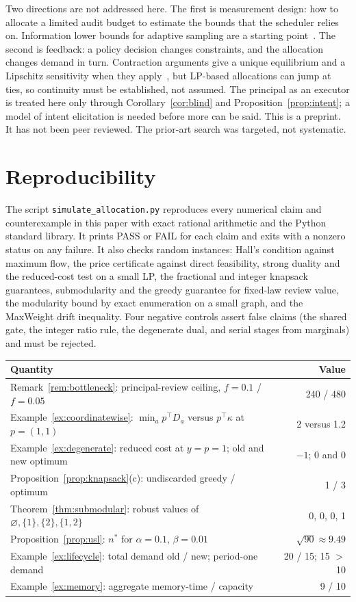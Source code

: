 \documentclass[11pt]{article}
\theoremstyle{definition}
\theoremstyle{remark}
\begin{document}
Two directions are not addressed here. The first is measurement design: how to allocate a limited audit budget
to estimate the bounds that the scheduler relies on. Information lower bounds for adaptive sampling are
a starting point~\cite{kaufmann}. The second is feedback: a policy decision changes constraints, and
the allocation changes demand in turn. Contraction arguments give a unique equilibrium and a Lipschitz
sensitivity when they apply~\cite{banach}, but LP-based allocations can jump at ties, so continuity
must be established, not assumed. The principal as an executor is treated here only through
Corollary~\ref{cor:blind} and Proposition~\ref{prop:intent}; a model of intent elicitation is needed
before more can be said. This is a preprint. It has not been peer reviewed. The prior-art search was targeted, not
systematic.

\section{Reproducibility}\label{sec:repro}
The script \texttt{simulate\_allocation.py} reproduces every numerical claim and counterexample in
this paper with exact rational arithmetic and the Python standard library. It prints PASS or FAIL for
each claim and exits with a nonzero status on any failure. It also checks random instances: Hall's
condition against maximum flow, the price certificate against direct feasibility, strong duality and
the reduced-cost test on a small LP, the fractional and integer knapsack guarantees, submodularity and
the greedy guarantee for fixed-law review value, the modularity bound by exact enumeration on a small
graph, and the MaxWeight drift inequality. Four negative controls assert false claims (the shared
gate, the integer ratio rule, the degenerate dual, and serial stages from marginals) and must be
rejected.

\begin{center}\small
\begin{tabular}{p{}r}
\toprule Quantity & Value\\\midrule
Remark~\ref{rem:bottleneck}: principal-review ceiling, $f=0.1$ / $f=0.05$ & 240 / 480\\
Example~\ref{ex:coordinatewise}: $\min_a p^\top D_a$ versus $p^\top\kappa$ at $p=(1,1)$ & 2 versus 1.2\\
Example~\ref{ex:degenerate}: reduced cost at $y=p=1$; old and new optimum & $-1$; 0 and 0\\
Proposition~\ref{prop:knapsack}(c): undiscarded greedy / optimum & 1 / 3\\
Theorem~\ref{thm:submodular}: robust values of $\varnothing,\{1\},\{2\},\{1,2\}$ & 0, 0, 0, 1\\
Proposition~\ref{prop:usl}: $n^\ast$ for $\alpha=0.1$, $\beta=0.01$ & $\sqrt{90}\approx9.49$\\
Example~\ref{ex:lifecycle}: total demand old / new; period-one demand & 20 / 15; 15 $>$ 10\\
Example~\ref{ex:memory}: aggregate memory-time / capacity & 9 / 10\\
\bottomrule
\end{tabular}
\end{center}
\end{document}
